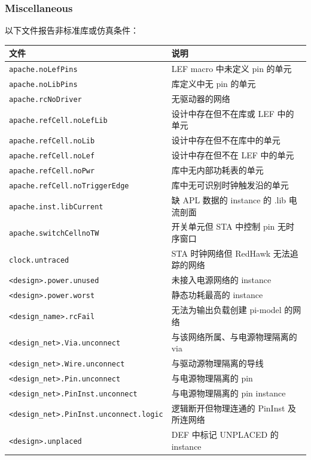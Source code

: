 \subsubsection*{Miscellaneous}

以下文件报告非标准库或仿真条件：

\begin{table}[htbp]
\centering
\small
\begin{tabular}{@{}p{4.5cm}p{8cm}@{}}
\toprule
文件 & 说明 \\
\midrule
\texttt{apache.noLefPins} & LEF macro 中未定义 pin 的单元 \\
\texttt{apache.noLibPins} & 库定义中无 pin 的单元 \\
\texttt{apache.rcNoDriver} & 无驱动器的网络 \\
\texttt{apache.refCell.noLefLib} & 设计中存在但不在库或 LEF 中的单元 \\
\texttt{apache.refCell.noLib} & 设计中存在但不在库中的单元 \\
\texttt{apache.refCell.noLef} & 设计中存在但不在 LEF 中的单元 \\
\texttt{apache.refCell.noPwr} & 库中无内部功耗表的单元 \\
\texttt{apache.refCell.noTriggerEdge} & 库中无可识别时钟触发沿的单元 \\
\texttt{apache.inst.libCurrent} & 缺 APL 数据的 instance 的 .lib 电流剖面 \\
\texttt{apache.switchCellnoTW} & 开关单元但 STA 中控制 pin 无时序窗口 \\
\texttt{clock.untraced} & STA 时钟网络但 RedHawk 无法追踪的网络 \\
\texttt{<design>.power.unused} & 未接入电源网络的 instance \\
\texttt{<design>.power.worst} & 静态功耗最高的 instance \\
\texttt{<design\_name>.rcFail} & 无法为输出负载创建 pi-model 的网络 \\
\texttt{<design\_net>.Via.unconnect} & 与该网络所属、与电源物理隔离的 via \\
\texttt{<design\_net>.Wire.unconnect} & 与驱动源物理隔离的导线 \\
\texttt{<design\_net>.Pin.unconnect} & 与电源物理隔离的 pin \\
\texttt{<design\_net>.PinInst.unconnect} & 与电源物理隔离的 pin instance \\
\texttt{<design\_net>.PinInst.unconnect.logic} & 逻辑断开但物理连通的 PinInst 及所连网络 \\
\texttt{<design>.unplaced} & DEF 中标记 UNPLACED 的 instance \\

\end{tabular}
\end{table}
